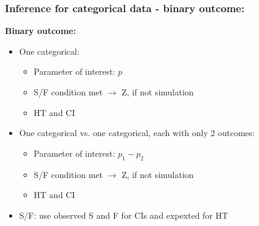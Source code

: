 \documentclass[11pt,containsverbatim,handout,xcolor=xelatex,dvipsnames,table]{beamer}
\begin{document}
\begin{frame}
\frametitle{Inference for categorical data - binary outcome:}

\textbf{Binary outcome:}

\pause

\begin{itemize}

\item One categorical: \\
\begin{itemize}
\item Parameter of interest: $p$
\item S/F condition met $\rightarrow$ Z, if not simulation
\item HT and CI
\end{itemize}

\pause

\item One categorical vs. one categorical, each with only 2 outcomes: \\
\begin{itemize}
\item Parameter of interest: $p_1 - p_2$
\item S/F condition met $\rightarrow$ Z, if not simulation
\item HT and CI
\end{itemize}

\pause

\item S/F: use observed S and F for CIs and expexted for HT

\end{itemize}

\end{frame}

\end{document}
